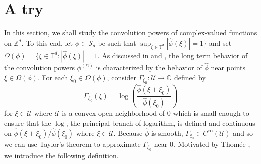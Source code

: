 \documentclass[11pt]{article}
\begin{document}
\section{A try}

In this section, we shall study the convolution powers of complex-valued functions on $\mathbb{Z}^d$. To this end, let $\phi\in\mathcal{S}_d$ be such that $\sup_{\xi\in\mathbb{T}^d}|\widehat{\phi}(\xi)|=1\}$ and set $\Omega(\phi)=\{\xi\in\mathbb{T}^d:|\widehat{\phi}(\xi)|=1$. As discussed in \cite{Randles2015} and \cite{Randles2017}, the long term behavior of the convolution powers $\phi^{(n)}$ is characterized by the behavior of $\widehat{\phi}$ near points $\xi\in \Omega(\phi)$. For each $\xi_0\in \Omega(\phi)$, consider $\Gamma_{\xi_0}:\mathcal{U}\to\mathbb{C}$ defined by
\begin{equation*}\Gamma_{\xi_0}(\xi)=\log\left(\frac{\widehat{\phi}(\xi+\xi_0)}{\widehat{\phi}(\xi_0)}\right)
\end{equation*}
for $\xi\in \mathcal{U}$ where $\mathcal{U}$ is a convex open neighborhood of $0$ which is small enough to ensure that the $\log$, the principal branch of logarithm, is defined and continuous on $\widehat{\phi}(\xi+\xi_0)/\widehat{\phi}(\xi_0)$ where $\xi\in\mathcal{U}$. Because $\hat\phi$ is smooth, $\Gamma_{\xi_0}\in C^{\infty}(\mathcal{U})$ and so we can use Taylor's theorem to approximate $\Gamma_{\xi_0}$ near $0$. Motivated by Thom\'{e}e \cite{Thomee1965}, we introduce the following definition.
\end{document}
